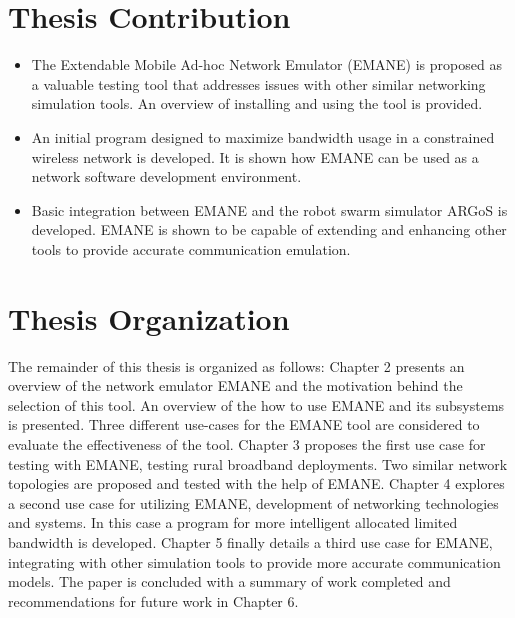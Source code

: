 \section{Thesis Contribution}
\begin{itemize}
    \item The Extendable Mobile Ad-hoc Network Emulator (EMANE) is proposed as a valuable testing tool that addresses issues with other similar networking simulation tools. An overview of installing and using the tool is provided.
    \item An initial program designed to maximize bandwidth usage in a constrained wireless network is developed. It is shown how EMANE can be used as a network software development environment.
    \item Basic integration between EMANE and the robot swarm simulator ARGoS is developed. EMANE is shown to be capable of extending and enhancing other tools to provide accurate communication emulation.
\end{itemize}


\section{Thesis Organization}
The remainder of this thesis is organized as follows:
Chapter 2 presents an overview of the network emulator EMANE and the motivation behind the selection of this tool. An overview of the how to use EMANE and its subsystems is presented.
Three different use-cases for the EMANE tool are considered to evaluate the effectiveness of the tool.
Chapter 3 proposes the first use case for testing with EMANE, testing rural broadband deployments. Two similar network topologies are proposed and tested with the help of EMANE.
Chapter 4 explores a second use case for utilizing EMANE, development of networking technologies and systems. In this case a program for more intelligent allocated limited bandwidth is developed.
Chapter 5 finally details a third use case for EMANE, integrating with other simulation tools to provide more accurate communication models.
The paper is concluded with a summary of work completed and recommendations for future work in Chapter 6.
